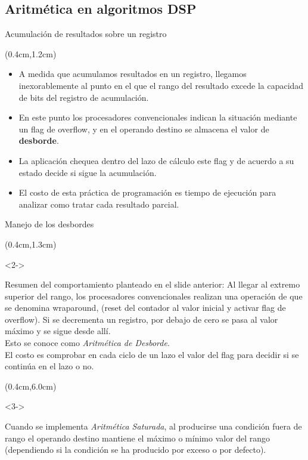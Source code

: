 \subsection{Aritmética en algoritmos DSP}
\begin{frame}{Acumulación de resultados sobre un registro}
 \begin{textblock*}{\textwidth}(0.4cm,1.2cm)
  \begin{itemize}[<+(1)->]\justifying
   \item A medida que acumulamos resultados en un registro, llegamos inexorablemente al punto en el que el rango del resultado excede la capacidad de bits del registro de acumulación.
   \item En este punto los procesadores convencionales indican la situación mediante un flag de overflow, y en el operando destino se almacena el valor de \textbf{desborde}.
   \item La aplicación chequea dentro del lazo de cálculo este flag y de acuerdo a su estado decide si sigue la acumulación.
   \item El costo de esta práctica de programación es tiempo de ejecución para analizar como tratar cada resultado parcial.
  \end{itemize}
 \end{textblock*} 
\end{frame}

\begin{frame}[t,fragile]{Manejo de los desbordes}
 \begin{textblock*}{\textwidth}(0.4cm,1.3cm)
  \begin{onlyenv}<2->
   \begin{tcolorbox}[enhanced jigsaw,rounded corners, drop fuzzy shadow=ShadowColor]
    Resumen del comportamiento planteado en el slide anterior: Al llegar al extremo superior del rango, los procesadores convencionales realizan una operación de que se denomina wraparound, (reset del contador al valor inicial y activar flag de overflow). Si se decrementa un registro, por debajo de cero se pasa al valor máximo y se sigue desde allí.\\ Esto se conoce como \textit{Aritmética de Desborde}.\\
    El costo es comprobar en cada ciclo de un lazo el valor del flag para decidir si se continúa en el lazo o no. 
   \end{tcolorbox}
  \end{onlyenv}
 \end{textblock*} 
 \begin{textblock*}{\textwidth}(0.4cm,6.0cm)
  \begin{onlyenv}<3->
   \begin{tcolorbox}[enhanced jigsaw,rounded corners, drop fuzzy shadow=ShadowColor]
    Cuando se implementa \textit{Aritmética Saturada}, al producirse una condición fuera de rango el operando destino mantiene el máximo o mínimo valor del rango (dependiendo si la condición se ha producido por exceso o por defecto).
   \end{tcolorbox}
  \end{onlyenv}
 \end{textblock*} 
\end{frame}

